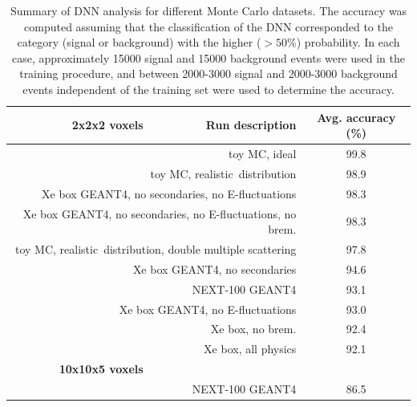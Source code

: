 \documentclass[a4paper,11pt]{article}
\begin{document}
\begin{table}[!htb]
	\begin{center}
		\caption[DNN analysis summary]{\label{tbl.DNNsummary}Summary of DNN analysis for different Monte Carlo datasets.  The accuracy was computed assuming that the classification
			of the DNN corresponded to the category (signal or background) with the higher ($> 50$\%) probability.  In each case, approximately 15000 signal and 15000 background events were
			used in the training procedure, and between 2000-3000 signal and 2000-3000 background events independent of the training set were used to determine the accuracy.}
		\begin{tabular}{rrc}
			\\
			\textbf{2x2x2 voxels} & \textbf{Run description} & \textbf{Avg. accuracy} (\%)\\
			\hline
			\multicolumn{2}{r}{toy MC, ideal} & 99.8\\
			\multicolumn{2}{r}{toy MC, realistic \bbonu\,distribution} & 98.9\\
			\multicolumn{2}{r}{Xe box GEANT4, no secondaries, no E-fluctuations} & 98.3\\
			\multicolumn{2}{r}{Xe box GEANT4, no secondaries, no E-fluctuations, no brem.} & 98.3\\
			\multicolumn{2}{r}{toy MC, realistic \bbonu\,distribution, double multiple scattering} & 97.8\\
			\multicolumn{2}{r}{Xe box GEANT4, no secondaries} & 94.6\\
			\multicolumn{2}{r}{NEXT-100 GEANT4} & 93.1\\
			\multicolumn{2}{r}{Xe box GEANT4, no E-fluctuations} & 93.0\\
			\multicolumn{2}{r}{Xe box, no brem.} & 92.4\\
			\multicolumn{2}{r}{Xe box, all physics} & 92.1\\
			\textbf{10x10x5 voxels} & & \\
			\hline
			\multicolumn{2}{r}{NEXT-100 GEANT4} & 86.5
		\end{tabular}
	\end{center}
\end{table}

\end{document}
